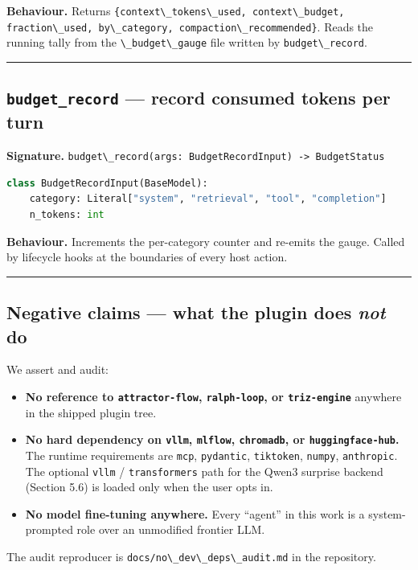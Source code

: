 \textbf{Behaviour.} Returns \passthrough{\lstinline!\{context\_tokens\_used, context\_budget, fraction\_used, by\_category, compaction\_recommended\}!}. Reads the running tally from the \passthrough{\lstinline!\_budget\_gauge!} file written by \passthrough{\lstinline!budget\_record!}.

\begin{center}\rule{0.5\linewidth}{0.5pt}\end{center}

\subsection{\texorpdfstring{\texttt{budget\_record} --- record consumed tokens per turn}{budget\_record --- record consumed tokens per turn}}\label{budget_record-record-consumed-tokens-per-turn}

\textbf{Signature.} \passthrough{\lstinline!budget\_record(args: BudgetRecordInput) -> BudgetStatus!}

\begin{lstlisting}[language=Python]
class BudgetRecordInput(BaseModel):
    category: Literal["system", "retrieval", "tool", "completion"]
    n_tokens: int
\end{lstlisting}

\textbf{Behaviour.} Increments the per-category counter and re-emits the gauge. Called by lifecycle hooks at the boundaries of every host action.

\begin{center}\rule{0.5\linewidth}{0.5pt}\end{center}

\subsection{\texorpdfstring{Negative claims --- what the plugin does \emph{not} do}{Negative claims --- what the plugin does not do}}\label{negative-claims-what-the-plugin-does-not-do}

We assert and audit:

\begin{itemize}
\tightlist
\item
  \textbf{No reference to \passthrough{\lstinline!attractor-flow!}, \passthrough{\lstinline!ralph-loop!}, or \passthrough{\lstinline!triz-engine!}} anywhere in the shipped plugin tree.
\item
  \textbf{No hard dependency on \passthrough{\lstinline!vllm!}, \passthrough{\lstinline!mlflow!}, \passthrough{\lstinline!chromadb!}, or \passthrough{\lstinline!huggingface-hub!}.} The runtime requirements are \passthrough{\lstinline!mcp!}, \passthrough{\lstinline!pydantic!}, \passthrough{\lstinline!tiktoken!}, \passthrough{\lstinline!numpy!}, \passthrough{\lstinline!anthropic!}. The optional \passthrough{\lstinline!vllm!} / \passthrough{\lstinline!transformers!} path for the Qwen3 surprise backend (Section 5.6) is loaded only when the user opts in.
\item
  \textbf{No model fine-tuning anywhere.} Every ``agent'' in this work is a system-prompted role over an unmodified frontier LLM.
\end{itemize}

The audit reproducer is \passthrough{\lstinline!docs/no\_dev\_deps\_audit.md!} in the repository.
